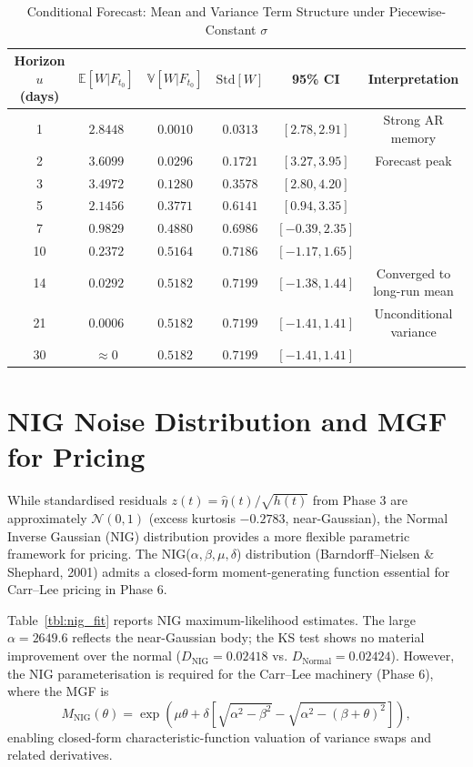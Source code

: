 \documentclass[11pt, a4paper, twoside]{article}
\begin{document}
\begin{table}[ht]
\centering
\caption{Conditional Forecast: Mean and Variance Term Structure under Piecewise-Constant $\sigma$}
\label{tbl:conditional_forecast}
\small
\begin{tabularx}{\textwidth}{c|cc|cc|c}
\toprule
\textbf{Horizon $u$ (days)} & $\mathbb{E}[W|F_{t_0}]$ & $\mathbb{V}[W|F_{t_0}]$ & $\text{Std}[W]$ & 95\% CI & Interpretation \\
\midrule
1 & $2.8448$ & $0.0010$ & $0.0313$ & $[2.78, 2.91]$ & Strong AR memory \\
2 & $3.6099$ & $0.0296$ & $0.1721$ & $[3.27, 3.95]$ & Forecast peak \\
3 & $3.4972$ & $0.1280$ & $0.3578$ & $[2.80, 4.20]$ & \\
5 & $2.1456$ & $0.3771$ & $0.6141$ & $[0.94, 3.35]$ & \\
7 & $0.9829$ & $0.4880$ & $0.6986$ & $[-0.39, 2.35]$ & \\
10 & $0.2372$ & $0.5164$ & $0.7186$ & $[-1.17, 1.65]$ & \\
14 & $0.0292$ & $0.5182$ & $0.7199$ & $[-1.38, 1.44]$ & Converged to long-run mean \\
21 & $0.0006$ & $0.5182$ & $0.7199$ & $[-1.41, 1.41]$ & Unconditional variance \\
30 & $\approx 0$ & $0.5182$ & $0.7199$ & $[-1.41, 1.41]$ & \\
\bottomrule
\end{tabularx}
\end{table}

\section{NIG Noise Distribution and MGF for Pricing}

While standardised residuals $z(t) = \hat{\eta}(t) / \sqrt{h(t)}$ from Phase 3 are approximately $\mathcal{N}(0,1)$ (excess kurtosis $-0.2783$, near-Gaussian), the Normal Inverse Gaussian (NIG) distribution provides a more flexible parametric framework for pricing. The NIG($\alpha, \beta, \mu, \delta$) distribution (Barndorff--Nielsen \& Shephard, 2001) admits a closed-form moment-generating function essential for Carr--Lee pricing in Phase 6.

Table~\ref{tbl:nig_fit} reports NIG maximum-likelihood estimates. The large $\alpha = 2649.6$ reflects the near-Gaussian body; the KS test shows no material improvement over the normal ($D_{\text{NIG}} = 0.02418$ vs. $D_{\text{Normal}} = 0.02424$). However, the NIG parameterisation is required for the Carr--Lee machinery (Phase 6), where the MGF is
\begin{equation}
M_{\text{NIG}}(\theta) = \exp\left( \mu \theta + \delta \left[ \sqrt{\alpha^2 - \beta^2} - \sqrt{\alpha^2 - (\beta+\theta)^2} \right] \right),
\end{equation}
enabling closed-form characteristic-function valuation of variance swaps and related derivatives.
\end{document}

